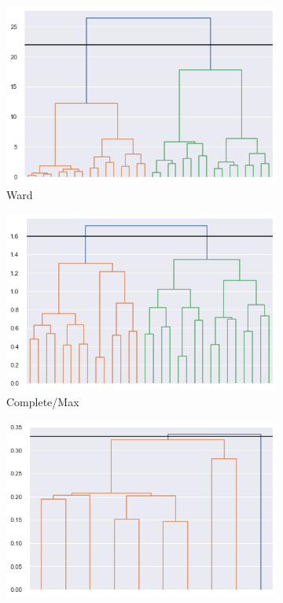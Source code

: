 \begin{figure}[h]
  \begin{subfigure}[b]{0.48\textwidth}
		\includegraphics[width=\textwidth]{plots/hierarchical/hierarchical_dendogram_ward.png}
		\caption{Ward}
  \end{subfigure}
  \begin{subfigure}[b]{0.48\textwidth}
		\includegraphics[width=\textwidth]{plots/hierarchical/hierarchical_dendogram_complete.png}
		\caption{Complete/Max}
  \end{subfigure}
	\begin{subfigure}[b]{0.48\textwidth}
		\includegraphics[width=\textwidth]{plots/hierarchical/hierarchical_dendogram_single.png}

\end{subfigure}
\end{figure}
